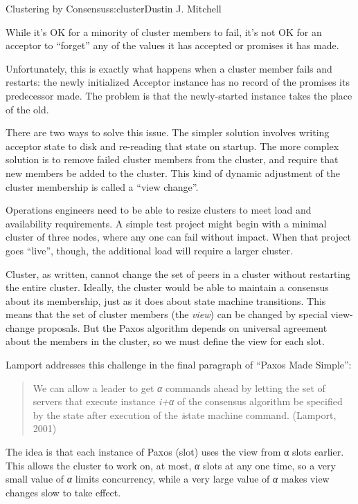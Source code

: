\begin{aosachapter}{Clustering by Consensus}{s:cluster}{Dustin J. Mitchell}
\label{persistent-storage}

While it's OK for a minority of cluster members to fail, it's not OK for
an acceptor to ``forget'' any of the values it has accepted or promises
it has made.

Unfortunately, this is exactly what happens when a cluster member fails
and restarts: the newly initialized Acceptor instance has no record of
the promises its predecessor made. The problem is that the newly-started
instance takes the place of the old.

There are two ways to solve this issue. The simpler solution involves
writing acceptor state to disk and re-reading that state on startup. The
more complex solution is to remove failed cluster members from the
cluster, and require that new members be added to the cluster. This kind
of dynamic adjustment of the cluster membership is called a ``view
change''.

\label{view-changes}

Operations engineers need to be able to resize clusters to meet load and
availability requirements. A simple test project might begin with a
minimal cluster of three nodes, where any one can fail without impact.
When that project goes ``live'', though, the additional load will
require a larger cluster.

Cluster, as written, cannot change the set of peers in a cluster without
restarting the entire cluster. Ideally, the cluster would be able to
maintain a consensus about its membership, just as it does about state
machine transitions. This means that the set of cluster members (the
\emph{view}) can be changed by special view-change proposals. But the
Paxos algorithm depends on universal agreement about the members in the
cluster, so we must define the view for each slot.

Lamport addresses this challenge in the final paragraph of ``Paxos Made
Simple'':

\begin{quote}
We can allow a leader to get \emph{α} commands ahead by letting the set
of servers that execute instance \emph{i+α} of the consensus algorithm
be specified by the state after execution of the \emph{i}\th state
machine command. (Lamport, 2001)
\end{quote}

The idea is that each instance of Paxos (slot) uses the view from α
slots earlier. This allows the cluster to work on, at most, \emph{α}
slots at any one time, so a very small value of \emph{α} limits
concurrency, while a very large value of \emph{α} makes view changes
slow to take effect.


\end{aosachapter}
